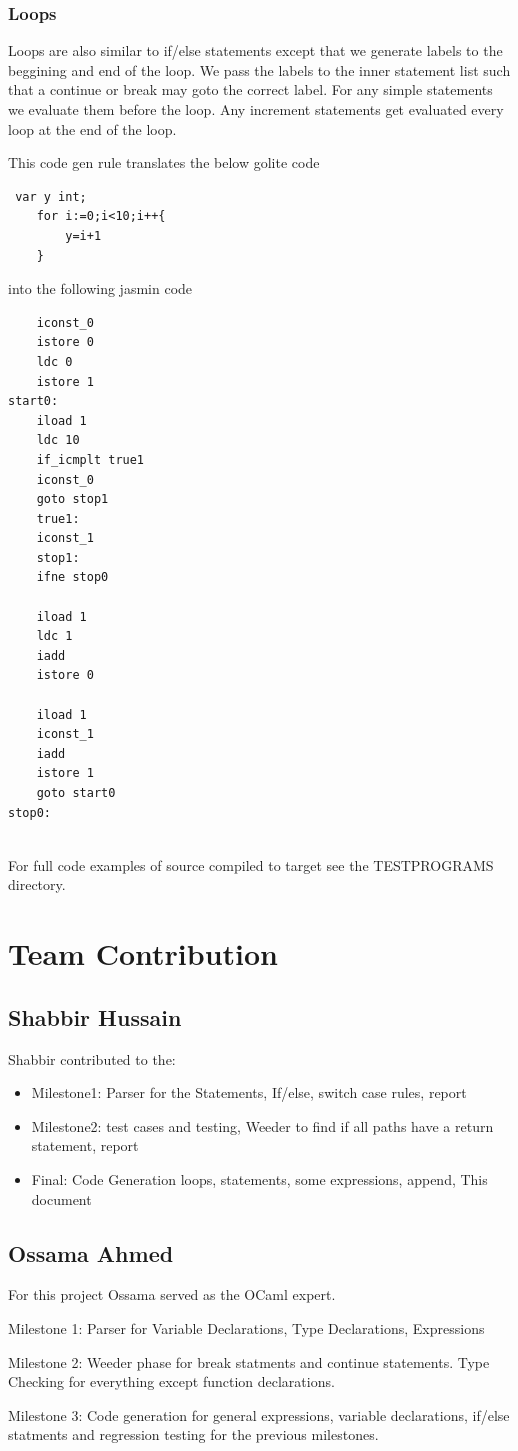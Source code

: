 \documentclass{article}
\begin{document}
\subsubsection*{Loops}
Loops are also similar to if/else statements except that we generate labels to the beggining and end of the loop. We pass the labels to the inner statement list such that a continue or break may goto the correct label. For any simple statements we evaluate them before the loop. Any increment statements get evaluated every loop at the end of the loop.

This code gen rule translates the below golite code
\begin{lstlisting}
 var y int;
    for i:=0;i<10;i++{
        y=i+1
    }

\end{lstlisting}
into the following jasmin code
\begin{lstlisting}
	iconst_0
	istore 0
	ldc 0
	istore 1
start0:
	iload 1
	ldc 10
	if_icmplt true1
	iconst_0
	goto stop1
	true1:
	iconst_1
	stop1:
	ifne stop0

	iload 1
	ldc 1
	iadd
	istore 0
	
	iload 1
	iconst_1
	iadd
	istore 1
	goto start0
stop0:


\end{lstlisting}

For full code examples of source compiled to target see the TESTPROGRAMS directory.

\section{Team Contribution}

\subsection{Shabbir Hussain}
Shabbir contributed to the:

\begin{itemize}
\item Milestone1: Parser for the Statements, If/else, switch case rules, report
\item Milestone2: test cases and testing, Weeder to find if all paths have a return statement, report
\item Final: Code Generation loops, statements, some expressions, append, This document
\end{itemize}


\subsection{Ossama Ahmed}
For this project Ossama served as the OCaml expert.
\item Milestone 1: Parser for Variable Declarations, Type Declarations, Expressions 
\item Milestone 2: Weeder phase for break statments and continue statements. Type Checking for everything except function declarations.  
\item Milestone 3: Code generation for general expressions, variable declarations, if/else statments and regression testing for the previous milestones.   
\end{document}
